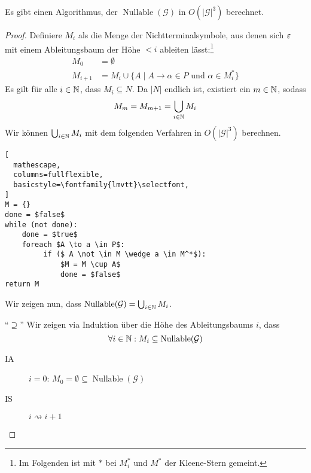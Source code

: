 \begin{Satz}
  Es gibt einen Algorithmus, der $\operatorname{Nullable}(\mathcal{G})$ in $O(|\mathcal{G}|^3)$ berechnet.
\end{Satz}
\begin{proof}
  Definiere $M_i$ als die Menge der Nichtterminalsymbole, aus denen sich
  $\varepsilon$ mit einem Ableitungsbaum der Höhe $< i$ ableiten lässt:\footnote{
  Im Folgenden ist mit $*$ bei $M_i^*$ und $M^*$ der Kleene-Stern gemeint.} 
  \begin{align*}
    M_0 &= \emptyset \\
    M_{i+1} &= M_i \cup \{ A \mid A \to \alpha \in P \text{ und }
              \alpha \in M_i^* \}
  \end{align*}
  Es gilt für alle $i \in \mathbb{N}$, dass $M_i \subseteq N$.
  Da $|N|$ endlich ist, existiert ein $m \in \mathbb{N}$, sodass
  \begin{displaymath}
    M_m = M_{m+1} = \bigcup_{i \in \mathbb{N}} M_i
  \end{displaymath}
  Wir können $\bigcup_{i \in \mathbb{N}} M_i$ mit dem folgenden Verfahren in $O(|\mathcal{G}|^3)$ berechnen.
  
  \begin{center}
  \begin{minipage}{7cm}
  \begin{lstlisting}[
  mathescape,
  columns=fullflexible,
  basicstyle=\fontfamily{lmvtt}\selectfont,
]
M = {}
done = $false$
while (not done):
    done = $true$
    foreach $A \to a \in P$:
         if ($ A \not \in M \wedge a \in M^*$):
             $M = M \cup A$
             done = $false$
return M
\end{lstlisting}
\end{minipage}
\end{center}

  Wir zeigen nun, dass $\operatorname{Nullable}(\mathcal{G}) = \bigcup_{i \in \mathbb{N}} M_i$.

  \medskip
  
  "`$\supseteq$"'\quad
  Wir zeigen via Induktion über die Höhe des Ableitungsbaums $i$, dass 
  $$\forall i \in \mathbb{N}: M_i \subseteq \operatorname{Nullable}(\mathcal{G})$$
  \begin{description}
  \item[IA] $i = 0$: $M_0 = \emptyset \subseteq \operatorname{Nullable}(\mathcal{G})$
  \item[IS] $i \rightsquigarrow i+1$


\end{description}
\end{proof}
